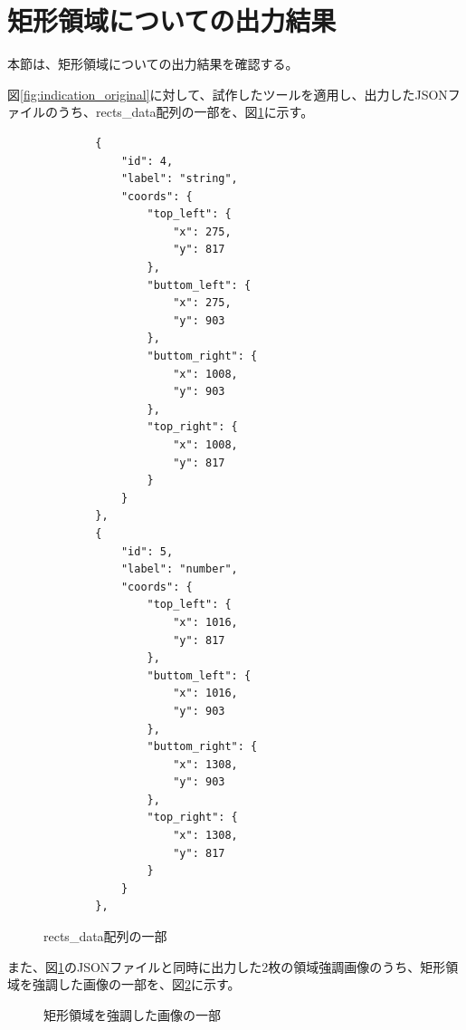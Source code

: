 \section{矩形領域についての出力結果}\label{sec:result_rect}
本節は、矩形領域についての出力結果を確認する。

図\ref{fig:indication_original}に対して、試作したツールを適用し、出力したJSONファイルのうち、rects\_data配列の一部を、図\ref{fig:rects_data_json}に示す。
\lstset{language=}
\begin{figure}[tp]
    \begin{lstlisting}
        {
            "id": 4,
            "label": "string",
            "coords": {
                "top_left": {
                    "x": 275,
                    "y": 817
                },
                "buttom_left": {
                    "x": 275,
                    "y": 903
                },
                "buttom_right": {
                    "x": 1008,
                    "y": 903
                },
                "top_right": {
                    "x": 1008,
                    "y": 817
                }
            }
        },
        {
            "id": 5,
            "label": "number",
            "coords": {
                "top_left": {
                    "x": 1016,
                    "y": 817
                },
                "buttom_left": {
                    "x": 1016,
                    "y": 903
                },
                "buttom_right": {
                    "x": 1308,
                    "y": 903
                },
                "top_right": {
                    "x": 1308,
                    "y": 817
                }
            }
        },
    \end{lstlisting}
    \caption{rects\_data配列の一部}\label{fig:rects_data_json}
\end{figure}
また、図\ref{fig:rects_data_json}のJSONファイルと同時に出力した2枚の領域強調画像のうち、矩形領域を強調した画像の一部を、図\ref{fig:highlighted_rects_part}に示す。
\begin{figure}[tp]
    \begin{center}
        \caption{矩形領域を強調した画像の一部}
        \label{fig:highlighted_rects_part}
    \end{center}
\end{figure}

